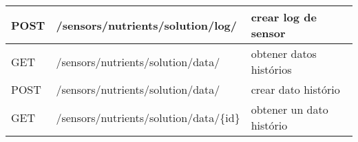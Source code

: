 \begin{table}[H]
\begin{tabular}{l l l}
        POST            & /sensors/nutrients/solution/log/      & crear log de sensor      \\
        \midrule
        GET             & /sensors/nutrients/solution/data/     & obtener datos histórios  \\
        POST            & /sensors/nutrients/solution/data/     & crear dato histório      \\
        GET             & /sensors/nutrients/solution/data/\{id\} & obtener un dato histório \\
        \bottomrule
        \hline
    \end{tabular}
    \label{tab:endpoints3}
\end{table}